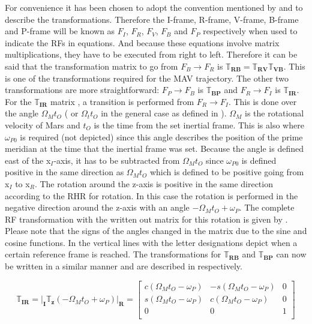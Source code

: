 For convenience it has been chosen to adopt the convention mentioned by \cite{mooij2013fd} and \cite{mooij2013stat} to describe the transformations. Therefore the I-frame, R-frame, V-frame, B-frame and P-frame will be known as $F_{I}$, $F_{R}$, $F_{V}$, $F_{B}$ and $F_{P}$ respectively when used to indicate the \ac{RF}s in equations. And because these equations involve matrix multiplications, they have to be executed from right to left. Therefore it can be said that the transformation matrix to go from $F_{B} \rightarrow F_{R}$ is $\mathbb{T}_{\mathbf{RB}}=\mathbb{T}_{\mathbf{RV}}\mathbb{T}_{\mathbf{VB}}$. This is one of the transformations required for the \ac{MAV} trajectory. The other two transformations are more straightforward: $F_{P} \rightarrow F_{B}$ is $\mathbb{T}_{\mathbf{BP}}$ and $F_{R} \rightarrow F_{I}$ is $\mathbb{T}_{\mathbf{IR}}$. For the $\mathbb{T}_{\mathbf{IR}}$ matrix , a transition is performed from $F_{R} \rightarrow F_{I}$. This is done over the angle $\Omega_{M}t_{O}$ ( or $\Omega_{t}t_{O}$ in the general case as defined in ). $\Omega_{M}$ is the rotational velocity of Mars and $t_{O}$ is the time from the set inertial frame. This is also where $\omega_{P0}$ is required (not depicted) since this angle describes the position of the prime meridian at the time that the inertial frame was set. Because the angle is defined east of the x$_{I}$-axis, it has to be subtracted from $\Omega_{M}t_{O}$ since $\omega_{P0}$ is defined positive in the same direction as $\Omega_{M}t_{O}$ which is defined to be positive going from x$_{I}$ to x$_{R}$. The rotation around the z-axis is positive in the same direction according to the \ac{RHR} for rotation. In this case the rotation is performed in the negative direction around the z-axis with an angle $-\Omega_{M}t_{O}+\omega_{P}$. The complete \ac{RF} transformation with the written out matrix for this rotation is given by . Please note that the signs of the angles changed in the matrix due to the sine and cosine functions. In  the vertical lines with the letter designations depict when a certain reference frame is reached. The transformations for $\mathbb{T}_{\mathbf{RB}}$ and $\mathbb{T}_{\mathbf{BP}}$ can now be written in a similar manner and are described in  respectively.

\begin{equation} \label{eq:IRtrans}
\mathbb{T}_{\mathbf{IR}}=\Bigg|_{\mathbf{I}}\mathbb{T}_{\mathbf{z}}\left(-\Omega_{M}t_{O}+\omega_{P}\right)\Bigg|_{\mathbf{R}}=
\begin{bmatrix}
c\left(\Omega_{M}t_{O}-\omega_{P}\right) & -s\left(\Omega_{M}t_{O}-\omega_{P}\right) & 0\\
s\left(\Omega_{M}t_{O}-\omega_{P}\right) & c\left(\Omega_{M}t_{O}-\omega_{P}\right) & 0\\
0& 0& 1\\
\end{bmatrix}
\end{equation}




